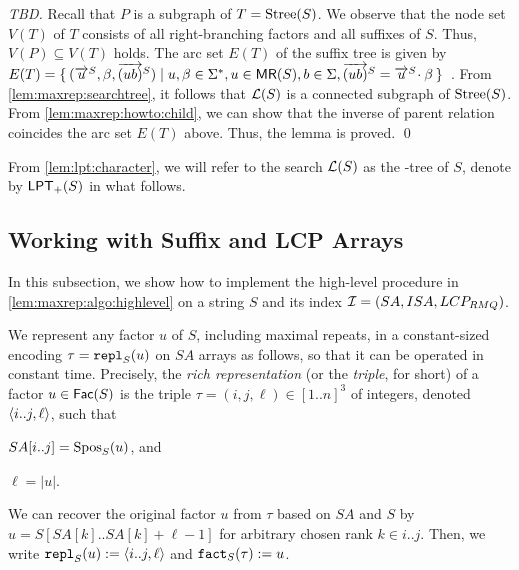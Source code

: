 \begin{proof} [TBD]
  Recall that $P$ is a subgraph of $T = \mathrm{Stree}(S)$. 
  We observe that the node set $V(T)$ of $T$ consists of all right-branching factors and all suffixes of $S$. Thus, $V(P)\subseteq V(T)$ holds.
  The arc set $E(T)$ of the suffix tree is given by
  $E(T) = \{\kern0.2em (\overrightarrow{u}^{S}, \beta, \overrightarrow{(ub)}^{S}) \mid u, \beta \in \Sigma^*, u \in \textsf{MR}(S), b \in \Sigma, \overrightarrow{(ub)}^{S} = \overrightarrow{u}^{S}\!\cdot \beta \kern0.2em\}$~\cite{crochemore2007algorithms:on:strings,inenaga2005online}.
  From \cref{lem:maxrep:searchtree}, it follows that $\mathcal{L}(S)$ is a connected subgraph of $\mathrm{Stree}(S)$. 
From \cref{lem:maxrep:howto:child}, we can show that the inverse of parent relation coincides the arc set $E(T)$ above. Thus, the lemma is proved. 
\qed
\end{proof}

From \cref{lem:lpt:character}, we will refer to the search $\mathcal{L}(S)$ as the \LPTrm-tree of $S$, denote by $\mathsf{LPT}_{+}(S)$ in what follows. 


\subsection{Working with Suffix and LCP Arrays}
\label{sec:constant:size:rep}

In this subsection, we show how to implement the high-level procedure in \cref{lem:maxrep:algo:highlevel} on a string $S$ and its index $\mathcal{I} = (SA, ISA, LCP_{RMQ})$.

\label{sec:constant:size:rep}
We represent any factor $u$ of $S$, including maximal repeats, in a constant-sized encoding $\tau = \mathtt{repl}_{S}(u)$ on $SA$ arrays as follows, so that it can be operated in constant time. 
Precisely, the \textit{rich representation} (or the \textit{triple}, for short) of a factor $u \in \mathsf{Fac}{(S)}$ is the triple $\tau = (i, j, \ell) \in [1..n]^3$ of integers, denoted $\langle i..j, \ell\rangle$, such that 
\begin{enumerate*}[(i)]
\item $SA[i..j] = \mathrm{Spos}_{S}(u)$, and 
\item $\ell = |u|$.
\end{enumerate*}
We can recover the original factor $u$ from $\tau$ based on $SA$ and $S$ by $u = S[SA[k]..SA[k]+\ell-1]$ for arbitrary chosen rank $k \in i..j$. Then, we write $\mathtt{repl}_{S}(u) := \langle i..j, \ell\rangle$ and $\mathtt{fact}_{S}(\tau) := u$. 

